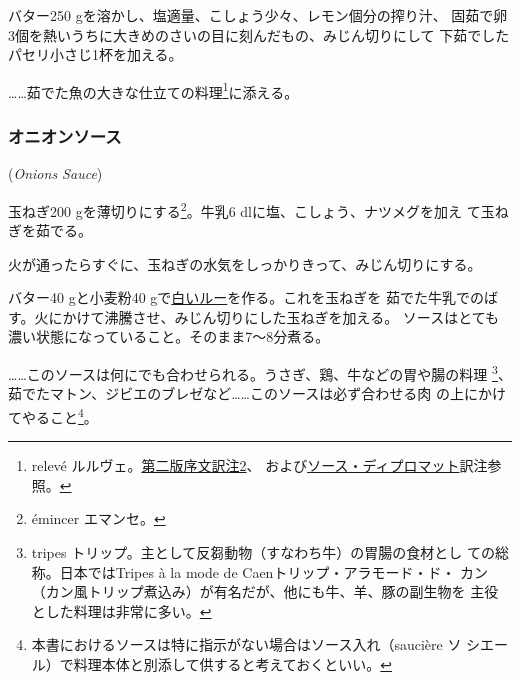 \begin{recette}
バター250 gを溶かし、塩適量、こしょう少々、レモン\undemi{}個分の搾り汁、
固茹で卵3個を熱いうちに大きめのさいの目に刻んだもの、みじん切りにして
下茹でしたパセリ小さじ1杯を加える。

\ldots{}\ldots{}茹でた魚の大きな仕立ての料理\footnote{relevé
  ルルヴェ。\protect\hyperlink{releve}{第二版序文訳注2}、
  および\protect\hyperlink{sauce-diplomate}{ソース・ディプロマット}訳注参照。}に添える。

\maeaki

\hypertarget{onions-sauce}{%
\subsubsection{オニオンソース}\label{onions-sauce}}

\hspace{1em}(\emph{Onions Sauce})


玉ねぎ200 gを薄切りにする\footnote{émincer エマンセ。}。牛乳6
dlに塩、こしょう、ナツメグを加え て玉ねぎを茹でる。

火が通ったらすぐに、玉ねぎの水気をしっかりきって、みじん切りにする。

バター40 gと小麦粉40
gで\protect\hyperlink{roux-blanc}{白いルー}を作る。これを玉ねぎを
茹でた牛乳でのばす。火にかけて沸騰させ、みじん切りにした玉ねぎを加える。
ソースはとても濃い状態になっていること。そのまま7〜8分煮る。

\ldots{}\ldots{}このソースは何にでも合わせられる。うさぎ、鶏、牛などの胃や腸の料理
\footnote{tripes
  トリップ。主として反芻動物（すなわち牛）の胃腸の食材とし
  ての総称。日本ではTripes à la mode de Caenトリップ・アラモード・ド・
  カン（カン風トリップ煮込み）が有名だが、他にも牛、羊、豚の副生物を
  主役とした料理は非常に多い。}、茹でたマトン、ジビエのブレゼなど\ldots{}\ldots{}このソースは必ず合わせる肉
の上にかけてやること\footnote{本書におけるソースは特に指示がない場合はソース入れ（saucière
  ソ シエール）で料理本体と別添して供すると考えておくといい。}。


\end{recette}
